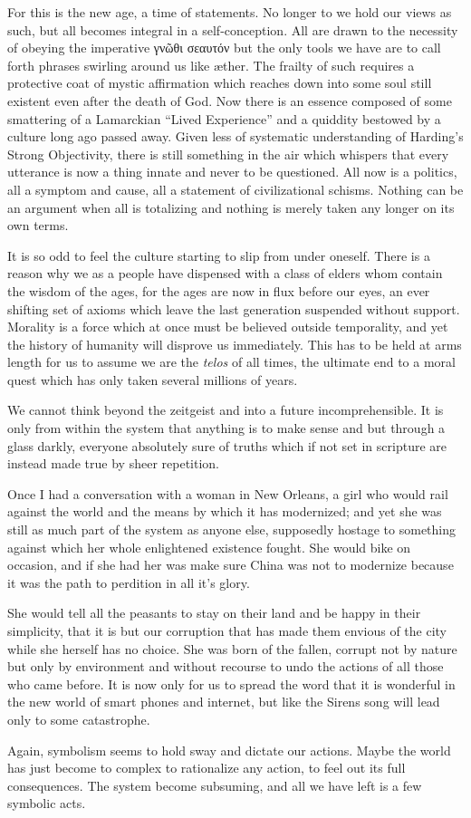 \documentclass[ebook, 10pt, openright, onecolumn]{memoir}
\newcommand{\textgreek}[1]{\begingroup\fontencoding{LGR}\selectfont#1\endgroup}
\begin{document}
For this is the new age, a time of statements.  No longer to we hold our views
as such, but all becomes integral in a self-conception. All are drawn to the
necessity of obeying the imperative \textgreek{γνῶθι σεαυτόν} but the only tools
we have are to call forth phrases swirling around us like {\ae}ther.  The
frailty of such requires a protective coat of mystic affirmation which reaches
down into some soul still existent even after the death of God. Now there is an
essence composed of some smattering of a Lamarckian ``Lived Experience'' and a
quiddity bestowed by a culture long ago passed away.  Given less of systematic
understanding of Harding's Strong Objectivity, there is still something in the
air which whispers that every utterance is now a thing innate and never to be
questioned.  All now is a politics, all a symptom and cause, all a statement of
civilizational schisms.  Nothing can be an argument when all is totalizing and
nothing is merely taken any longer on its own terms.

It is so odd to feel the culture starting to slip from under oneself.  There is
a reason why we as a people have dispensed with a class of elders whom contain
the wisdom of the ages, for the ages are now in flux before our eyes, an ever
shifting set of axioms which leave the last generation suspended without
support.  Morality is a force which at once must be believed outside
temporality, and yet the history of humanity will disprove us immediately.  This
has to be held at arms length for us to assume we are the \textit{telos} of all
times, the ultimate end to a moral quest which has only taken several millions
of years.

We cannot think beyond the zeitgeist and into a future incomprehensible.  It is
only from within the system that anything is to make sense and but through a
glass darkly, everyone absolutely sure of truths which if not set in scripture
are instead made true by sheer repetition.  

Once I had a conversation with a woman in New Orleans, a girl who would rail
against the world and the means by which it has modernized; and yet she was
still as much part of the system as anyone else, supposedly hostage to something
against which her whole enlightened existence fought.  She would bike on
occasion, and if she had her was make sure China was not to modernize because it
was the path to perdition in all it's glory.

She would tell all the peasants to stay on their land and be happy in their
simplicity, that it is but our corruption that has made them envious of the city
while she herself has no choice.  She was born of the fallen, corrupt not by
nature but only by environment and without recourse to undo the actions of all
those who came before.  It is now only for us to spread the word that it is
wonderful in the new world of smart phones and internet, but like the Sirens
song will lead only to some catastrophe.


Again, symbolism seems to hold sway and dictate our actions.  Maybe the world
has just become to complex to rationalize any action, to feel out its full
consequences.  The system become subsuming, and all we have left is a few
symbolic acts.
\end{document}
